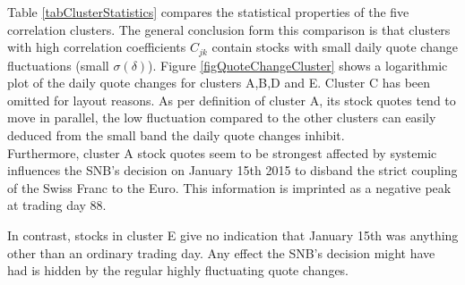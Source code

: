 \documentclass[
10pt, %
a4paper, %
oneside, %
headinclude,footinclude, %
BCOR5mm, %
]{scrartcl}
\numberwithin{equation}{subsection}
\begin{document}

Table \ref{tabClusterStatistics} compares the statistical properties of the five correlation clusters. The general conclusion form this comparison is that clusters with high correlation coefficients $C_{jk}$ contain stocks with small daily quote change fluctuations (small $\sigma(\delta)$). Figure \ref{figQuoteChangeCluster} shows a logarithmic plot of the daily quote changes for clusters A,B,D and E. Cluster C has been omitted for layout reasons. As per definition of cluster A, its stock quotes tend to move in parallel, the low fluctuation compared to the other clusters can easily deduced from the small band the daily quote changes inhibit.\\
Furthermore, cluster A stock quotes seem to be strongest affected by systemic influences the SNB's decision on January 15th 2015 to disband the strict coupling of the Swiss Franc to the Euro. This information is imprinted as a negative peak at trading day 88.

In contrast, stocks in cluster E give no indication that January 15th was anything other than an ordinary trading day. Any effect the SNB's decision might have had is hidden by the regular highly fluctuating quote changes.\\
\end{document}
